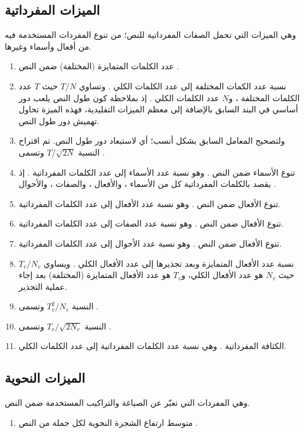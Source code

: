 \subsection{الميزات المفرداتية }
وهي الميزات التي تحمل الصفات المفرداتية للنص؛
من تنوع المفردات المستخدمة فيه من أفعال وأسماء وغيرها.
\begin{enumerate}[resume]
	\item 
	عدد الكلمات المتمايزة (المختلفة) ضمن النص .
	\item 
	نسبة عدد الكمات المختلفة إلى عدد الكلمات الكلي .
	وتساوي $T/N$ حيث $T$ عدد الكلمات المختلفة ،
	و$N$ عدد الكلمات الكلي .
	إذ بملاحظة كون طول النص يلعب دور أساسي في البند السابق بالإضافة إلى معظم الميزات التقليدية،
	فهذه الميزة تحاول تهميش دور طول النص.
	\item 
	ولتصحيح المعامل السابق بشكل أنسب؛ أي لاستبعاد دور طول النص.
	تم اقتراح النسبة $T/\sqrt{2N}$ وتسمى .
	\item 
	تنوع الأسماء ضمن النص .
	وهو نسبة عدد الأسماء إلى عدد الكلمات المفرداتية .
	إذ يقصد بالكلمات المفرداتية كل من الأسماء ، والأفعال ،
	والصفات ، والأحوال .
	\item 
	تنوع الأفعال ضمن النص .
	وهو نسبة عدد الأفعال إلى عدد الكلمات المفرداتية.
	\item 
	تنوع الأفعال ضمن النص .
	وهو نسبة عدد الصفات إلى عدد الكلمات المفرداتية.
	\item 
	تنوع الأفعال ضمن النص .
	وهو نسبة عدد الأحوال إلى عدد الكلمات المفرداتية.
	\item 
	نسبة عدد الأفعال المتمايزة وبعد تجذيرها إلى عدد الأفعال الكلي .
	ويساوي $T_v/N_v$ حيث $N_v$ هو عدد الأفعال الكلي،
	و$T_v$ هو عدد الأفعال المتمايزة (المختلفة) بعد إجاء عملية التجذير.
	\item 
	النسبة $T_v^2/N_v$ وتسمى .
	\item 
	النسبة $T_v/\sqrt{2N_v}$ وتسمى .
	\item 
	الكثافة المفرداتية .
	وهي نسبة عدد الكلمات المفرداتية إلى عدد الكلمات الكلي.
\end{enumerate}



\subsection{الميزات النحوية }
وهي المفردات التي تعبّر عن الصياغة والتراكيب المستخدمة ضمن النص.
\begin{enumerate}[resume]
	\item 
	متوسط ارتفاع الشجرة النحوية لكل جملة من النص .
\end{enumerate}


